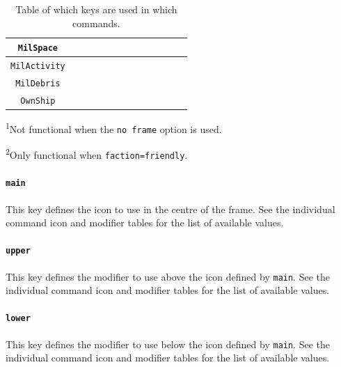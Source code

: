 \documentclass[a4paper, titlepage]{article}
\begin{document}
\begin{table}[H]
\begin{tabular}{|c|c|c|c|c|c|c|c|c|c|c|c|c|}
\texttt{MilSpace} &  &  &  &  &  &  &  &  \cellcolor{black} &  & \cellcolor{black} & \cellcolor{black} & \cellcolor{black}\\ \hline
\texttt{MilActivity} &  &  &  & \cellcolor{black} &  &  &  & \cellcolor{black} &  \cellcolor{black} &  & \cellcolor{black} & \cellcolor{black}\\ \hline
\texttt{MilDebris} & \cellcolor{black} & \cellcolor{black} & \cellcolor{black} & \cellcolor{black} & \cellcolor{black} & \cellcolor{black} & &  \cellcolor{black} & \cellcolor{black} & \cellcolor{black} & \cellcolor{black} & \cellcolor{black}\\ \hline
\texttt{OwnShip} & \cellcolor{black} & \cellcolor{black} & \cellcolor{black} & \cellcolor{black} & \cellcolor{black} & \cellcolor{black} & &  \cellcolor{black} & \cellcolor{black} & \cellcolor{black} & \cellcolor{black} & \cellcolor{black}\\ \hline
\end{tabular}
\begin{tablenotes}
\item \textsuperscript{1}Not functional when the \texttt{no frame} option is used.
\item \textsuperscript{2}Only functional when \texttt{faction=friendly}.
\end{tablenotes}
\caption{Table of which keys are used in which commands.}
\label{shared}
\end{table}

\paragraph{\texttt{main}}

This key defines the icon to use in the centre of the frame. See the individual command icon and modifier tables for the list of available values.

\paragraph{\texttt{upper}} 

This key defines the modifier to use above the icon defined by \texttt{main}. See the individual command icon and modifier tables for the list of available values.

\paragraph{\texttt{lower}} 

This key defines the modifier to use below the icon defined by \texttt{main}. See the individual command icon and modifier tables for the list of available values.
\end{document}

